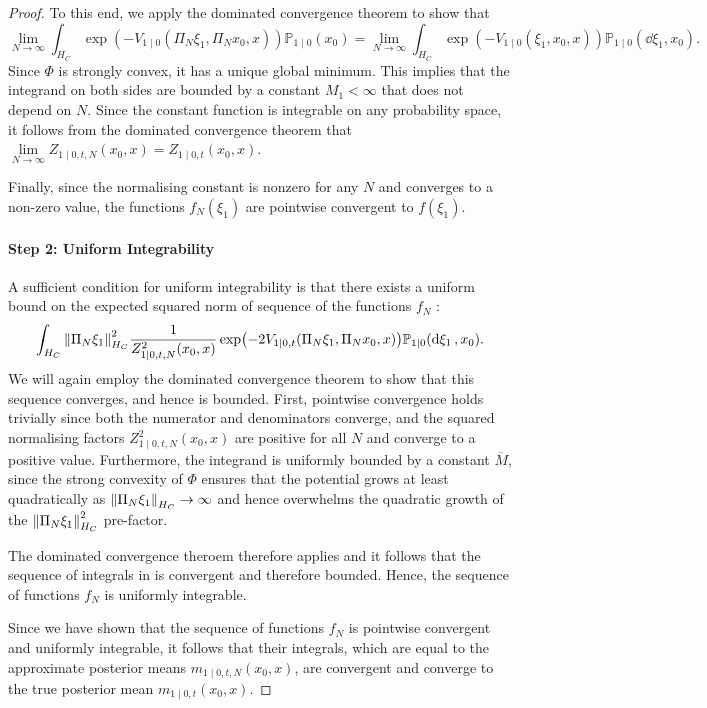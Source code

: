 \begin{lemma}
\begin{proof}
    To this end, we apply the dominated convergence theorem to show that
    \[
      \lim\limits_{N \to \infty} \int_{H_{C}} \exp(-V_{1 \mid 0}(\Pi_{N} \xi_{1}, \Pi_{N} x_{0}, x)) \mathbb{P}_{1 \mid 0}(x_{0}) = \lim\limits_{N \to \infty} \int_{H_{C}} \exp(-V_{1 \mid 0}(\xi_{1}, x_{0}, x)) \mathbb{P}_{1 \mid 0}(\dd{\xi_{1}}, x_{0}).
    \]
    Since \(\Phi\) is strongly convex, it has a unique global minimum. This implies that the integrand on both sides are bounded by a constant \(M_{1} < \infty\) that does not depend on \(N\). Since the constant function is integrable on any probability space, it follows from the dominated convergence theorem that \(\lim\limits_{N \to \infty} Z_{1 \mid 0, t, N}(x_{0}, x) = Z_{1 \mid 0, t}(x_{0}, x)\).

    Finally, since the normalising constant is nonzero for any \(N\) and converges to a non-zero value, the functions \(f_{N}(\xi_{1})\) are pointwise convergent to \(f(\xi_{1})\).

    \paragraph{Step 2: Uniform Integrability}
    A sufficient condition for uniform integrability is that there exists a uniform bound on the expected squared norm of sequence of the functions \(f_{N}\) \citep[][Theorem 3.5]{billingsley2013convergence}:
    \begin{equation}
      \int_{H_{C}} \norm{\Pi_{N} \xi_{1}}_{H_{C}}^{2} \frac{1}{Z_{1 \mid 0, t, N}^{2}(x_{0}, x)} \exp(-2 V_{1 \mid 0, t}(\Pi_{N} \xi_{1}, \Pi_{N} x_{0}, x)) \mathbb{P}_{1 \mid0}(\dd{\xi_{1}}, x_{0}). \label{eqn:dc2}
    \end{equation}
    We will again employ the dominated convergence theorem to show that this sequence converges, and hence is bounded. First, pointwise convergence holds trivially since both the numerator and denominators converge, and the squared normalising factors \(Z^{2}_{1 \mid 0, t, N}(x_{0}, x)\) are positive for all \(N\) and converge to a positive value. Furthermore, the integrand is uniformly bounded by a constant \(\overline{M}\), since the strong convexity of \(\Phi\) ensures that the potential grows at least quadratically as \(\norm{\Pi_{N} \xi_{1}}_{H_{C}} \to \infty\) and hence overwhelms the quadratic growth of the \(\norm{\Pi_{N} \xi_{1}}^{2}_{H_{C}}\) pre-factor.

    The dominated convergence theroem therefore applies and it follows that the sequence of integrals in  is convergent and therefore bounded. Hence, the sequence of functions \(f_{N}\) is uniformly integrable.

    Since we have shown that the sequence of functions \(f_{N}\) is pointwise convergent and uniformly integrable, it follows that their integrals, which are equal to the approximate posterior means \(m_{1 \mid 0, t, N}(x_{0}, x)\), are convergent and converge to the true posterior mean \(m_{1 \mid 0, t}(x_{0}, x)\).
  \end{proof}
\end{lemma}

